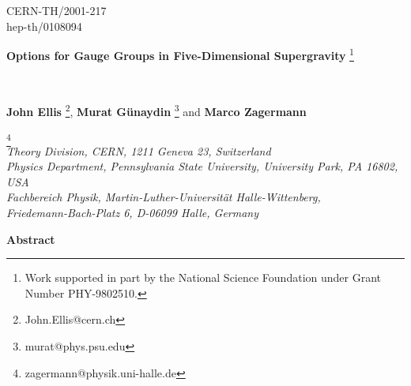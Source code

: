\documentclass[a4paper,11pt]{article}
\begin{document}
\begin{titlepage}
\begin{flushright}
CERN-TH/2001-217\\
hep-th/0108094\\
\end{flushright}
\vspace{0.2cm}
\begin{center}
\begin{LARGE}
\textbf{Options for Gauge Groups in Five-Dimensional Supergravity
}\footnote{ Work supported
  in part by the National
Science Foundation under Grant Number PHY-9802510.}
\end{LARGE}\\
\vspace{1.0cm}
\begin{large}
{\bf John Ellis}\myHighlight{$^{\dagger}$}\coordHE{} \footnote{John.Ellis@cern.ch}, 
{\bf Murat G\"{u}naydin}\myHighlight{$^{\dagger\ddagger}$}\coordHE{} \footnote{murat@phys.psu.edu}
and
{\bf Marco Zagermann}\myHighlight{$^{\ast}$}\coordHE{}
\end{large}\footnote{zagermann@physik.uni-halle.de} \\
\vspace{.35cm}
\myHighlight{$^{\dagger}$}\coordHE{} \emph{Theory Division, CERN,
1211 Geneva 23, Switzerland} \\
\vspace{.3cm}
\myHighlight{$^{\ddagger}$}\coordHE{} \emph{Physics Department,
Pennsylvania State University,
University Park, PA 16802, USA} \\
\vspace{.3cm}
\myHighlight{$^{\ast}$}\coordHE{} \emph{Fachbereich Physik,
Martin-Luther-Universit\"{a}t Halle-Wittenberg,\\
Friedemann-Bach-Platz 6, D-06099 Halle, Germany}\\

\vspace{.3cm}

\vspace{0.5cm}
{\bf Abstract}
\end{center}
\begin{small}


\end{small}
\end{titlepage}
\end{document}
